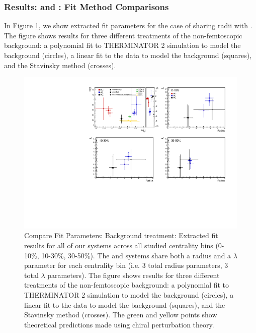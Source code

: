 \documentclass[/home/jesse/Analysis/FemtoAnalysis/AnalysisNotes/AnalysisNoteJBuxton.tex]{subfiles}
\begin{document}
\subsubsection{Results: \LamKs and \LamKpm: Fit Method Comparisons}
\label{ResultsLamK_FitMethComp}

In Figure \ref{fig:FitResults_ShareR_Sharelam_PolyBgd}, we show extracted fit parameters for the case of \LamKchPALamKchM sharing radii with \LamKchMALamKchP.  The figure shows results for three different treatments of the non-femtoscopic background: a polynomial fit to THERMINATOR 2 simulation to model the background (circles), a linear fit to the data to model the background (squares), and the Stavinsky method (crosses).


\begin{figure}[h]
  \centering
  \includegraphics[width=\textwidth]{7_ResultsAndDiscussion/Figures/CompareAllScattParams_CompBgdTreatment_StatOnly.pdf}
  \caption[Compare Fit Parameters: Background treatment]{Compare Fit Parameters: Background treatment: Extracted fit results for all of our \LamALamKpm systems across all studied centrality bins (0-10\%, 10-30\%, 30-50\%).  The \LamKchPALamKchM and \LamKchMALamKchP systems share both a radius and a $\lambda$ parameter for each centrality bin (i.e. 3 total radius parameters, 3 total $\lambda$ parameters).  The figure shows results for three different treatments of the non-femtoscopic background: a polynomial fit to THERMINATOR 2 simulation to model the background (circles), a linear fit to the data to model the background (squares), and the Stavinsky method (crosses).  The green \cite{Liu:2006xja} and yellow \cite{Mai:2009ce} points show theoretical predictions made using chiral perturbation theory.}
  \label{fig:FitResults_ShareR_Sharelam_PolyBgd}
\end{figure}
\end{document}
